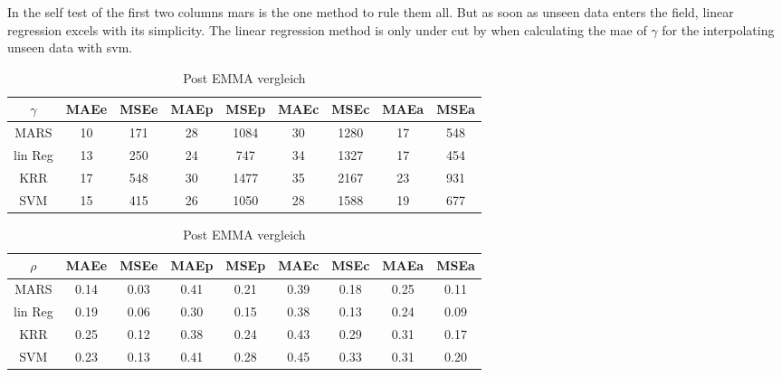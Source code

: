 In the self test of the first two columns \gls{mars} is the one method to rule them all.
But as soon as unseen data enters the field, linear regression excels with its simplicity. 
The linear regression method is only under cut by when calculating the \gls{mae} of $\gamma$
for the interpolating unseen data with \gls{svm}. 
%
%
\begin{table}[htb]
	\centering
    \caption{Post EMMA vergleich}
	\label{tab:post-emma}
	\begin{tabular}{c cc cc cc cc}
    \hline\hline
    $\gamma$&  MAEe&   MSEe&   MAEp&   MSEp&   MAEc&   MSEc&   MAEa& MSEa \\
    \hline
        MARS&   10& 171&    28& 1084&   30& 1280&   17& 548\\
        lin Reg&    13& 250&    24& 747&    34& 1327&   17& 454\\
        KRR &17 &548 &30 &1477 &35 &2167 &23 &931\\
        SVM& 15&  415&    26& 1050&   28& 1588&   19& 677\\
    \hline\hline
	\end{tabular}
	\begin{tabular}{c cc cc cc cc}
    \hline\hline
    $\rho$&  MAEe&   MSEe&   MAEp&   MSEp&   MAEc&   MSEc&   MAEa& MSEa \\
    \hline
        MARS&   0.14&   0.03&   0.41&   0.21&   0.39&   0.18&   0.25&   0.11\\
        lin Reg&    0.19&   0.06&   0.30&   0.15&   0.38&   0.13&   0.24&   0.09\\
        KRR &0.25 &0.12 &0.38 &0.24 &0.43 &0.29 &0.31 &0.17\\
        SVM &0.23 &0.13 &0.41 &0.28 &0.45 &0.33 &0.31 &0.20\\
    \hline\hline
	\end{tabular}
\end{table}
    
